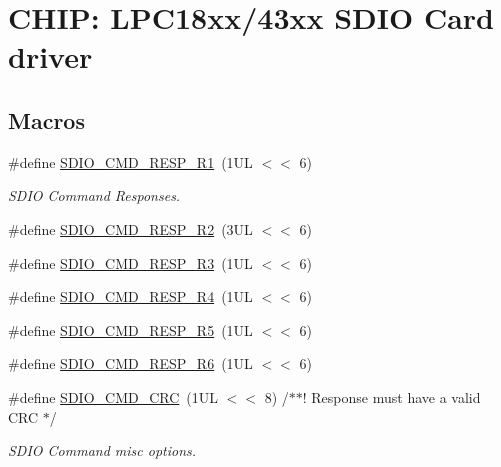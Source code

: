 \hypertarget{group___s_d_i_o__18_x_x__43_x_x}{}\section{C\+H\+IP\+: L\+P\+C18xx/43xx S\+D\+IO Card driver}
\label{group___s_d_i_o__18_x_x__43_x_x}
\subsection*{Macros}
\begin{DoxyCompactItemize}
\item 
\#define \hyperlink{group___s_d_i_o__18_x_x__43_x_x_ga74936e4059fa646fdd3a62c68252e3bc}{S\+D\+I\+O\+\_\+\+C\+M\+D\+\_\+\+R\+E\+S\+P\+\_\+\+R1}~(1\+U\+L $<$$<$ 6)
\begin{DoxyCompactList}\small\item\em S\+D\+IO Command Responses. \end{DoxyCompactList}\item 
\#define \hyperlink{group___s_d_i_o__18_x_x__43_x_x_gae08429760806cb077de3a65bf22fc11a}{S\+D\+I\+O\+\_\+\+C\+M\+D\+\_\+\+R\+E\+S\+P\+\_\+\+R2}~(3\+U\+L $<$$<$ 6)
\item 
\#define \hyperlink{group___s_d_i_o__18_x_x__43_x_x_ga14bb18c3444739c3d43704fc8cb341e1}{S\+D\+I\+O\+\_\+\+C\+M\+D\+\_\+\+R\+E\+S\+P\+\_\+\+R3}~(1\+U\+L $<$$<$ 6)
\item 
\#define \hyperlink{group___s_d_i_o__18_x_x__43_x_x_ga16e699b4a068de39f712e5605e730260}{S\+D\+I\+O\+\_\+\+C\+M\+D\+\_\+\+R\+E\+S\+P\+\_\+\+R4}~(1\+U\+L $<$$<$ 6)
\item 
\#define \hyperlink{group___s_d_i_o__18_x_x__43_x_x_ga6fa4ac27f75edbdf59f840cecd675f9f}{S\+D\+I\+O\+\_\+\+C\+M\+D\+\_\+\+R\+E\+S\+P\+\_\+\+R5}~(1\+U\+L $<$$<$ 6)
\item 
\#define \hyperlink{group___s_d_i_o__18_x_x__43_x_x_ga935f51abdef49f44cde7c6978b829618}{S\+D\+I\+O\+\_\+\+C\+M\+D\+\_\+\+R\+E\+S\+P\+\_\+\+R6}~(1\+U\+L $<$$<$ 6)
\item 
\#define \hyperlink{group___s_d_i_o__18_x_x__43_x_x_ga7faeb5b3ae0de2806d36876b625cded6}{S\+D\+I\+O\+\_\+\+C\+M\+D\+\_\+\+C\+RC}~(1\+U\+L $<$$<$ 8)  /$\ast$$\ast$! Response must have a valid C\+R\+C $\ast$/
\begin{DoxyCompactList}\small\item\em S\+D\+IO Command misc options. \end{DoxyCompactList}\item 

\end{DoxyCompactItemize}
